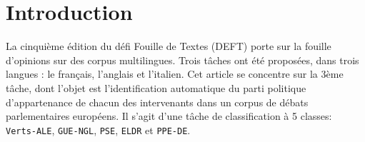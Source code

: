 \section{Introduction}

La cinquième édition du défi Fouille de Textes (DEFT) porte sur la fouille d'opinions sur des corpus multilingues. Trois tâches ont été proposées, dans trois langues : le français, l'anglais et l'italien. Cet article se concentre sur la 3ème tâche, dont l'objet est l'identification automatique du parti politique d'appartenance de chacun des intervenants dans un corpus de débats parlementaires européens. Il s'agit d'une tâche de classification à 5 classes: \texttt{Verts-ALE}, \texttt{GUE-NGL}, \texttt{PSE}, \texttt{ELDR} et \texttt{PPE-DE}. 

\par 
